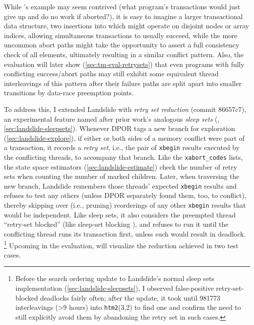 While 's example may seem contrived
(what program's transactions would just give up and do no work if aborted?),
it is easy to imagine a larger transactional data structure,
two insertions into which might operate on disjoint nodes or array indices,
allowing simultaneous transactions to usually succeed,
while the more uncommon abort paths might take the opportunity to assert a full consistency check of all elements,
ultimately resulting in a similar conflict pattern.
Also, the evaluation will later show
(\cref{sec:tm-eval-retrysets})
that even programs with fully conflicting success/abort paths
may still exhibit some equivalent thread interleavings of this pattern
after their failure paths are split apart into smaller transitions by data-race preemption points.

To address this,
I extended Landslide
with {\em retry set reduction} (commit 86657c7),
an experimental feature named after prior work's analogous {\em sleep sets}
(\cite{partial-order-methods,dpor,optimal-dpor}, \cref{sec:landslide-sleepsets}).
Whenever DPOR tags a new branch for exploration (\cref{sec:landslide-explore}),
if either or both sides of a memory conflict were part of a transaction,
it records a {\em retry set},
i.e., the pair of {\tt xbegin} results executed by the conflicting threads,
to accompany that branch.
Like the {\tt xabort\_codes} lists, the state space estimators (\cref{sec:landslide-estimate})
check the number of retry sets when counting the number of marked children.
Later, when traversing the new branch,
Landslide remembers those threads' expected {\tt xbegin} results
and refuses to test any others
(unless DPOR separately found them, too, to conflict),
thereby skipping over (i.e., pruning) reorderings of any other {\tt xbegin} results that would be independent.
Like sleep sets, it also considers the preempted thread ``retry-set blocked''
(like sleep-set blocking \cite{optimal-dpor}),
and refuses to run it until the conflicting thread runs its transaction first,
unless such would result in deadlock.%
\footnote{
	Before the search ordering update to Landslide's normal sleep sets implementation
	(\cref{sec:landslide-sleepsets}),
	I observed false-positive retry-set-blocked deadlocks fairly often;
	after the update,
	it took until 981773 interleavings (>9 hours) into {\tt htm2}(3,2) to find one
	and confirm the need to still explicitly avoid them by abandoning the retry set in such cases.
}
Upcoming in the evaluation,  will visualize the reduction achieved in two test cases.

